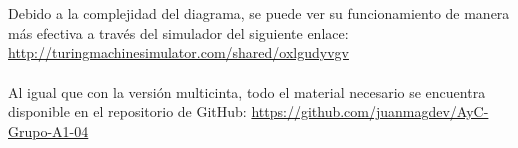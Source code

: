 \documentclass[11pt, a4paper]{exam}
\begin{document}
\begin{questions}
\begin{parts}
\begin{solution}
            \\
            \\
            Debido a la complejidad del diagrama, se puede ver su funcionamiento de manera más efectiva a través del simulador del siguiente enlace: \url{http://turingmachinesimulator.com/shared/oxlgudyvgv}
            \\
            \\
            Al igual que con la versión multicinta, todo el material necesario se encuentra disponible en el repositorio de GitHub: \url{https://github.com/juanmagdev/AyC-Grupo-A1-04}
        \end{solution}
    \end{parts}

\end{questions}



\end{document}
